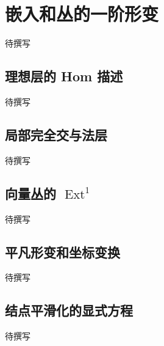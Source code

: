 
% 
% 

\section{嵌入和丛的一阶形变}
\label{g5:sec:3202}

待撰写

\subsection{理想层的 Hom 描述}
\label{g5:subsec:3202:01}
待撰写

\subsection{局部完全交与法层}
\label{g5:subsec:3202:02}
待撰写

\subsection{\texorpdfstring{向量丛的 \(\operatorname{Ext}^1\)}{向量丛的 Ext¹}}
\label{g5:subsec:3202:03}
待撰写

\subsection{平凡形变和坐标变换}
\label{g5:subsec:3202:04}
待撰写

\subsection{结点平滑化的显式方程}
\label{g5:subsec:3202:05}
待撰写
